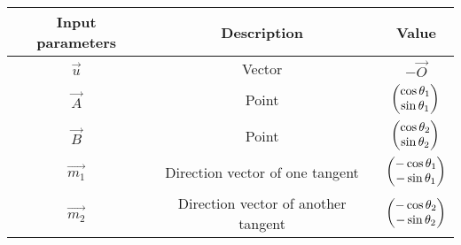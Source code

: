     \begin{tabular}{|c|c|c|}
    \hline
         \textbf{Input parameters}& \textbf{Description}&\textbf{Value} \\
         \hline
         $\vec{u}$&Vector&$-\vec{O}$\\
         \hline
          $\vec{A}$&Point &$\begin{pmatrix}\cos{\theta_1}\\\sin{\theta_1}\end{pmatrix}$ \\
       \hline
       $\vec{B}$&Point &$\begin{pmatrix}\cos{\theta_2}\\\sin{\theta_2}\end{pmatrix}$ \\
       \hline
          $\vec{m_1}$&Direction vector of one tangent&$\begin{pmatrix}-\cos{\theta_1}\\-\sin{\theta_1}\end{pmatrix}$\\
       \hline
       $\vec{m_2}$& Direction vector of another tangent &$\begin{pmatrix}-\cos{\theta_2}\\-\sin{\theta_2}\end{pmatrix}$ \\
       \hline
         \end{tabular}
